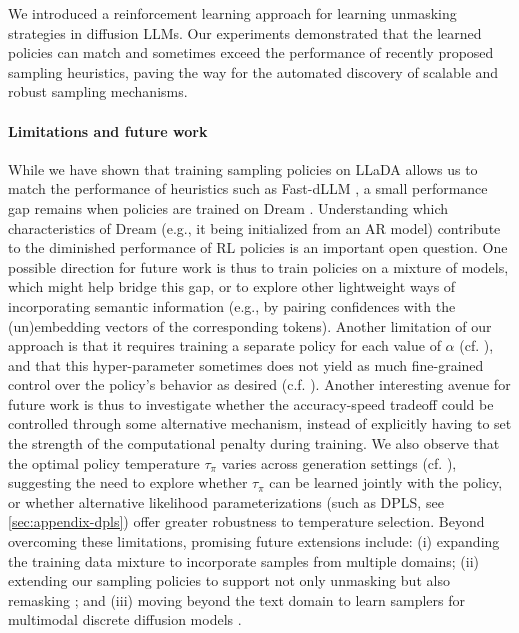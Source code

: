 We introduced a reinforcement learning approach for learning unmasking strategies in diffusion LLMs.
Our experiments demonstrated that the learned policies can match and sometimes exceed the performance of recently proposed sampling heuristics, paving the way for the automated discovery of scalable and robust sampling mechanisms. %

\paragraph{Limitations and future work} While we have shown that training sampling policies on LLaDA \citep{llada2025} allows us to match the performance of heuristics such as Fast-dLLM \citep{fastdllm2025}, a small performance gap remains when policies are trained on Dream \citep{ye2025dream}. Understanding which characteristics of Dream (e.g., it being initialized from an AR model) contribute to the diminished performance of RL policies is an important open question. 
One possible direction for future work is thus to train policies on a mixture of models, which might help bridge this gap, or to explore other lightweight ways of incorporating semantic information (e.g., by pairing confidences with the (un)embedding vectors of the corresponding tokens).
Another limitation of our approach is that it requires training a separate policy for each value of $\alpha$ (cf. ), and that this hyper-parameter sometimes does not yield as much fine-grained control over the policy's behavior as desired (c.f. ).
Another interesting avenue for future work is thus to investigate whether the accuracy-speed tradeoff could be controlled through some alternative mechanism, instead of explicitly having to set the strength of the computational penalty during training.
We also observe that the optimal policy temperature $\tau_{\pi}$ varies across generation settings (cf. ), suggesting the need to explore whether $\tau_{\pi}$ can be learned jointly with the policy, or whether alternative likelihood parameterizations (such as DPLS, see \autoref{sec:appendix-dpls}) offer greater robustness to temperature selection.
Beyond overcoming these limitations, promising future extensions include: (i) expanding the training data mixture to incorporate samples from multiple domains; (ii) extending our sampling policies to support not only unmasking but also remasking \citep{wang2025remasking}; and (iii) moving beyond the text domain to learn samplers for multimodal discrete diffusion models \citep{swerdlow2025unified}.
